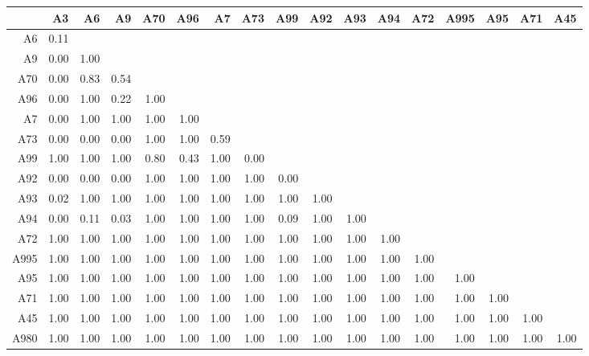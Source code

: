 \documentclass[a4paper,headsepline,footsepline,fontsize=11pt,BCOR=12mm,DIV=12]{report}
\begin{document}
\begin{table}[h]
	\tiny
	\setlength{\tabcolsep}{4pt}
	\centering
	\begin{tabular}{rrrrrrrrrrrrrrrrr}
		\toprule
		& A3 & A6 & A9 & A70 & A96 & A7 & A73 & A99 & A92 & A93 & A94 & A72 & A995 & A95 & A71 & A45 \\ 
		\midrule
		A6 & 0.11 &  &  &  &  &  &  &  &  &  &  &  &  &  &  &  \\ 
		A9 & 0.00 & 1.00 &  &  &  &  &  &  &  &  &  &  &  &  &  &  \\ 
		A70 & 0.00 & 0.83 & 0.54 &  &  &  &  &  &  &  &  &  &  &  &  &  \\ 
		A96 & 0.00 & 1.00 & 0.22 & 1.00 &  &  &  &  &  &  &  &  &  &  &  &  \\ 
		A7 & 0.00 & 1.00 & 1.00 & 1.00 & 1.00 &  &  &  &  &  &  &  &  &  &  &  \\ 
		A73 & 0.00 & 0.00 & 0.00 & 1.00 & 1.00 & 0.59 &  &  &  &  &  &  &  &  &  &  \\ 
		A99 & 1.00 & 1.00 & 1.00 & 0.80 & 0.43 & 1.00 & 0.00 &  &  &  &  &  &  &  &  &  \\ 
		A92 & 0.00 & 0.00 & 0.00 & 1.00 & 1.00 & 1.00 & 1.00 & 0.00 &  &  &  &  &  &  &  &  \\ 
		A93 & 0.02 & 1.00 & 1.00 & 1.00 & 1.00 & 1.00 & 1.00 & 1.00 & 1.00 &  &  &  &  &  &  &  \\ 
		A94 & 0.00 & 0.11 & 0.03 & 1.00 & 1.00 & 1.00 & 1.00 & 0.09 & 1.00 & 1.00 &  &  &  &  &  &  \\ 
		A72 & 1.00 & 1.00 & 1.00 & 1.00 & 1.00 & 1.00 & 1.00 & 1.00 & 1.00 & 1.00 & 1.00 &  &  &  &  &  \\ 
		A995 & 1.00 & 1.00 & 1.00 & 1.00 & 1.00 & 1.00 & 1.00 & 1.00 & 1.00 & 1.00 & 1.00 & 1.00 &  &  &  &  \\ 
		A95 & 1.00 & 1.00 & 1.00 & 1.00 & 1.00 & 1.00 & 1.00 & 1.00 & 1.00 & 1.00 & 1.00 & 1.00 & 1.00 &  &  &  \\ 
		A71 & 1.00 & 1.00 & 1.00 & 1.00 & 1.00 & 1.00 & 1.00 & 1.00 & 1.00 & 1.00 & 1.00 & 1.00 & 1.00 & 1.00 &  &  \\ 
		A45 & 1.00 & 1.00 & 1.00 & 1.00 & 1.00 & 1.00 & 1.00 & 1.00 & 1.00 & 1.00 & 1.00 & 1.00 & 1.00 & 1.00 & 1.00 &  \\ 
		A980 & 1.00 & 1.00 & 1.00 & 1.00 & 1.00 & 1.00 & 1.00 & 1.00 & 1.00 & 1.00 & 1.00 & 1.00 & 1.00 & 1.00 & 1.00 & 1.00 \\ 
		  \hline
	\end{tabular}
\end{table}
\end{document}
